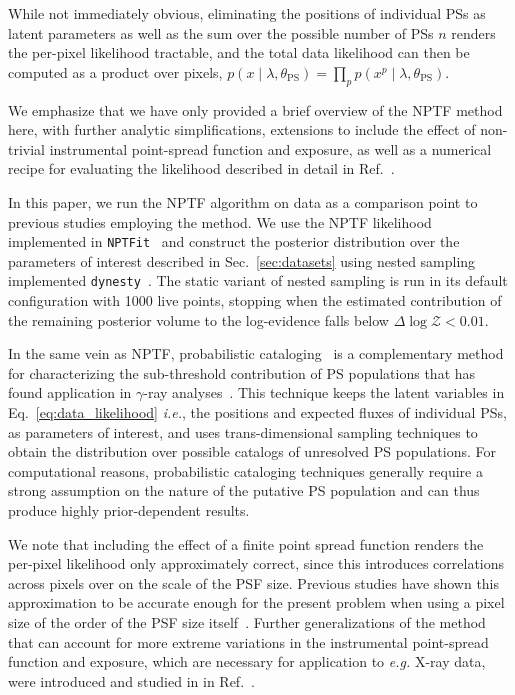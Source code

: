 \documentclass[prd,aps,10pt,nofootinbib,twocolumn,superscriptaddress,preprintnumbers,balancelastpage,longbibliography]{revtex4-1}
\begin{document}
While not immediately obvious, eliminating the positions of individual PSs as latent parameters as well as the sum over the possible number of PSs $n$ renders the per-pixel likelihood tractable, and the total data likelihood can then be computed as a product over pixels, $p(x\mid\lambda,\theta_\mathrm{PS}) = \prod_{p} p(x^p\mid\lambda,\theta_\mathrm{PS})$.

We emphasize that we have only provided a brief overview of the NPTF method here, with further analytic simplifications, extensions to include the effect of non-trivial instrumental point-spread function and exposure, as well as a numerical recipe for evaluating the likelihood described in detail in Ref.~\cite{Mishra-Sharma:2016gis}. 

In this paper, we run the NPTF algorithm on \Fermi data as a comparison point to previous studies employing the method. We use the NPTF likelihood implemented in \texttt{NPTFit}~\cite{Mishra-Sharma:2016gis} and construct the posterior distribution over the parameters of interest described in Sec.~\ref{sec:datasets} using nested sampling implemented \texttt{dynesty}~\cite{Speagle_2020}. The static variant of nested sampling is run in its default configuration with 1000 live points, stopping when the estimated contribution of the remaining posterior volume to the log-evidence falls below $\Delta \log \mathcal Z < 0.01$.

In the same vein as NPTF, probabilistic cataloging~\cite{2013AJ....146....7B,2021arXiv210202409L} is a complementary method for characterizing the sub-threshold contribution of PS populations that has found application in $\gamma$-ray analyses~\cite{Daylan:2016tia}. This technique keeps the latent variables in Eq.~\eqref{eq:data_likelihood} \emph{i.e.}, the positions and expected fluxes of individual PSs, as parameters of interest, and uses trans-dimensional sampling techniques to obtain the distribution over possible catalogs of unresolved PS populations. For computational reasons, probabilistic cataloging techniques generally require a strong assumption on the nature of the putative PS population and can thus produce highly prior-dependent results.

We note that including the effect of a finite point spread function renders the per-pixel likelihood only approximately correct, since this introduces correlations across pixels over on the scale of the PSF size. Previous studies have shown this approximation to be accurate enough for the present problem when using a pixel size of the order of the PSF size itself~\cite{Chang:2019ars}. Further generalizations of the method that can account for more extreme variations in the instrumental point-spread function and exposure, which are necessary for application to \emph{e.g.} X-ray data, were introduced and studied in in Ref.~\cite{Collin:2021ufc}.
\end{document}
